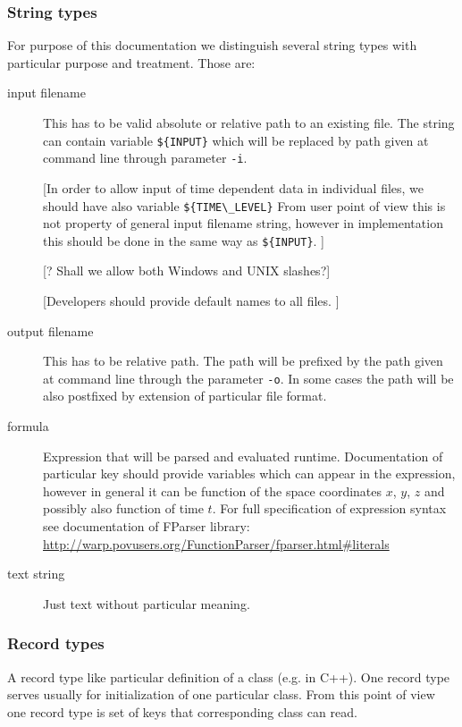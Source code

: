 \subsubsection{String types}
For purpose of this documentation we distinguish several string types with particular purpose and treatment. Those are:
\begin{description}
\item[input filename] This has to be valid absolute or relative path to an existing file. 
The string can contain variable \verb'${INPUT}' %
which will be replaced by path given at command line through parameter \verb'-i'.

[In order to allow input of  time dependent data in individual files, we should 
 have also variable \verb'${TIME\_LEVEL}' %
 From user point of view this is not property of general input filename string, however
 in implementation this should be done in the same way as \verb'${INPUT}'.
]
 
[? Shall we allow both Windows and UNIX slashes?]

[Developers should provide default names to all files. ]

\item[output filename] This has to be relative path. The path will be prefixed by
the path given at command line through the parameter \verb'-o'.
In some cases the path will be also postfixed by extension of particular file format.

\item[formula] Expression that will be parsed and evaluated runtime. Documentation of particular key should provide 
variables which can appear in the expression, however in general it can be function of the space coordinates $x$, $y$, $z$ and possibly also 
function of time $t$. For full specification of expression syntax see documentation of FParser library:
\url{http://warp.povusers.org/FunctionParser/fparser.html\#literals}

\item[text string] Just text without particular meaning.
\end{description}

\subsubsection{Record types}
A record type like particular definition of a class (e.g. in C++). One record type serves usually for initialization of 
one particular class. From this point of view one record type is set of keys that corresponding class can read.

